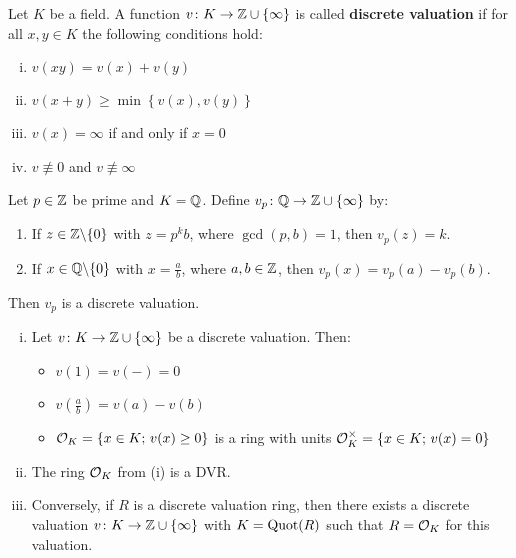 \begin{defi}
Let $K$ be a field. A function $v \colon K \to \mathbb{Z} \cup \{\infty\}$ is called \textbf{discrete valuation} if for all $x,y \in K$ the following conditions hold:
\begin{enumerate}[(i)]
	\item $v(xy) =v(x) +v(y)$
	\item $v(x+y) \geq \min \left\{ v(x), v(y) \right\}$
	\item $v(x) = \infty$ if and only if $x = 0$
	\item $v \not\equiv 0$ and $v \not \equiv \infty$
\end{enumerate}
\end{defi}

\begin{Bsp}
Let $p \in \mathbb{Z}$ be prime and $K = \mathbb{Q}$. Define $v_p \colon \mathbb{Q} \to \mathbb{Z} \cup \{\infty\}$ by:
\begin{enumerate}[(1)]
	\item If $z \in \mathbb{Z} \backslash \{0\}$ with $z =p^k b$, where $\gcd(p,b) =1$, then $v_p(z) = k$.
	\item If $x \in \mathbb{Q} \backslash \{0\}$ with $x = \frac{a}{b}$, where $a,b \in \mathbb{Z}$, then $v_p(x) = v_p(a) -v_p(b)$.
\end{enumerate}
Then $v_p$ is a discrete valuation.
\end{Bsp}


\begin{Prop} 
	\begin{enumerate}[(i)] 
		\item Let $v \colon K \to \mathbb{Z} \cup \{\infty\}$ be a discrete valuation. Then:
				\begin{itemize}
					\item $v(1) = v(-) = 0$
					\item $v \left( \frac{a}{b} \right) = v(a) -v(b)$
					\item $\mathcal{O}_K = \left\{ x \in K; \, v(x) \geq 0  \right\}$ is a ring with units
							$\mathcal{O}_K^\times = \left\{ x \in K; \, v(x) = 0  \right\}$ 
				\end{itemize}
		\item The ring $\mathcal{O}_K$ from (i) is a DVR.
		\item Conversely, if $R$ is a discrete valuation ring, then there exists a discrete valuation 
				$v \colon K \to \mathbb{Z} \cup \{\infty\}$ with $K= \operatorname{Quot}(R)$ such that $R= \mathcal{O}_K$ for this valuation.
	\end{enumerate}
\end{Prop}

